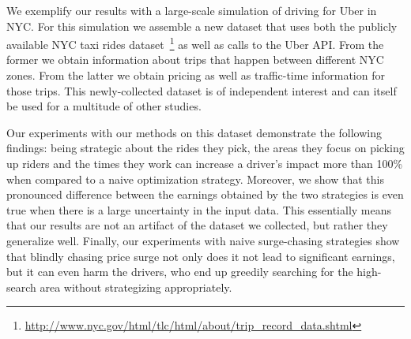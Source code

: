 We exemplify our  results with a large-scale simulation of driving for Uber in NYC. For this simulation we assemble a new dataset that uses both the publicly available NYC taxi rides 
dataset~\footnote{\url{http://www.nyc.gov/html/tlc/html/about/trip_record_data.shtml}} as well as calls to the Uber API. From the former we obtain information about trips that happen between different NYC zones. From the latter we obtain pricing as well as traffic-time information for those trips. This newly-collected dataset is of independent interest and can itself be used for a multitude of other studies.

Our experiments with our methods on this dataset demonstrate the following findings:
being strategic about the rides they pick, the areas they focus on picking up riders
and the times they work can increase a driver's impact more than 100\%  when compared
to a naive optimization strategy.
Moreover, we show that this pronounced difference between the earnings obtained by the 
two strategies is even true when there is a large uncertainty in the input data. This essentially means that our results are not an artifact of the dataset we collected, but rather they generalize well.
Finally, our experiments with naive surge-chasing strategies show that blindly chasing price surge not only does it not lead to significant earnings, but it can even harm the drivers, who end up greedily searching for the high-search area without strategizing appropriately.